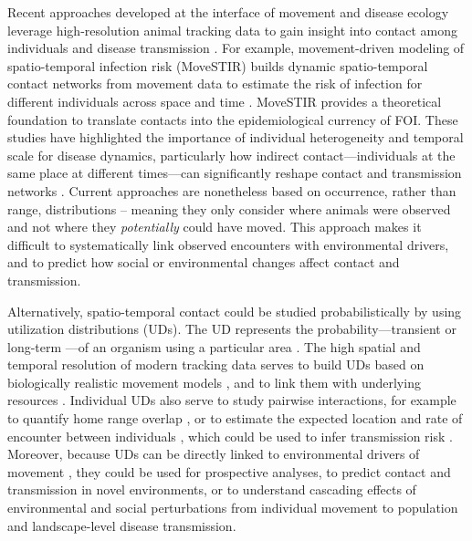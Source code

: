 \documentclass[letterpaper]{article}
\begin{document}
Recent approaches developed at the interface of movement and disease ecology leverage high-resolution animal tracking data to gain insight into contact among individuals and disease transmission \citep{Richardson2015,Wilber2022,Yang2023}. For example, movement-driven modeling of spatio-temporal infection risk (MoveSTIR) builds dynamic spatio-temporal contact networks from movement data to estimate the risk of infection for different individuals across space and time \citep{Wilber2022}. MoveSTIR provides a theoretical foundation to translate contacts into the epidemiological currency of FOI. These studies have highlighted the importance of individual heterogeneity and temporal scale for disease dynamics, particularly how indirect contact---individuals at the same place at different times---can significantly reshape contact and transmission networks \citep{Richardson2015,Yang2023}. Current approaches are nonetheless based on occurrence, rather than range, distributions \citep[in the terminology of ][]{Alston2022} -- meaning they only consider where animals were observed and not where they \emph{potentially} could have moved. This approach makes it difficult to systematically link observed encounters with environmental drivers, and to predict how social or environmental changes affect contact and transmission. 

Alternatively, spatio-temporal contact could be studied probabilistically by using utilization distributions (UDs). The UD represents the probability---transient or long-term \citep{Tao2016}---of an organism using a particular area \citep{Worton1989}. The high spatial and temporal resolution of modern tracking data serves to build UDs based on biologically realistic movement models \citep{Kranstauber2012,Fleming2014}, and to link them with underlying resources \citep{Potts2023}.
Individual UDs also serve to study pairwise interactions, for example to quantify home range overlap \citep{Winner2018}, or to estimate the expected location and rate of encounter between individuals \citep{Noonan2021}, which could be used to infer transmission risk \citep{Godfrey2010, Godfrey2013,Noonan2021}. 
Moreover, because UDs can be directly linked to environmental drivers of movement \citep{Signer2017}, they could be used for prospective analyses, to predict contact and transmission in novel environments, or to understand cascading effects of environmental and social perturbations from individual movement to population and landscape-level disease transmission. 
\end{document}
